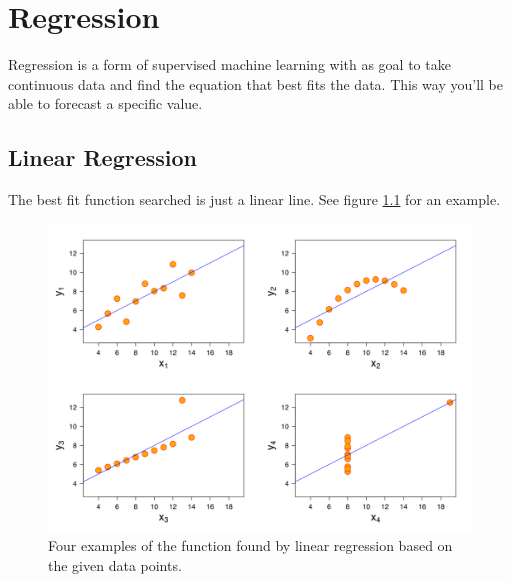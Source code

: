 \chapter{Regression}

Regression is a form of supervised machine learning with as goal to take continuous data and find the equation that best fits the data. This way you'll be able to forecast a specific value.

\section{Linear Regression}
The best fit function searched is just a linear line. See figure \ref{fig:linearregression} for an example.

\begin{figure}
\centering
\includegraphics[width=1\textwidth]{images/linear_regression.png}
\caption{\label{fig:linearregression}Four examples of the function found by linear regression based on the given data points.}
\end{figure}

